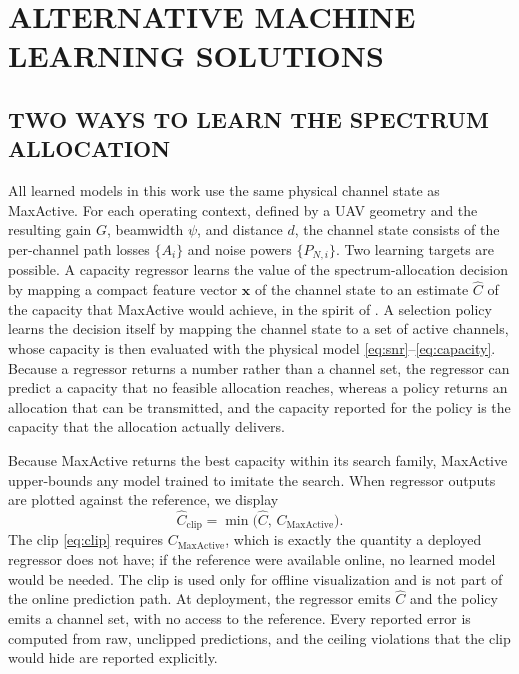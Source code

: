 \documentclass{ieee-ojvt}
\begin{document}
\section{ALTERNATIVE MACHINE LEARNING SOLUTIONS}
\label{sec:ml}
\subsection{TWO WAYS TO LEARN THE SPECTRUM ALLOCATION}
\label{sec:ml-overview}
All learned models in this work use the same physical channel state as MaxActive. For each
operating context, defined by a UAV geometry and the resulting gain $G$, beamwidth $\psi$,
and distance $d$, the channel state consists of the per-channel path losses $\{A_i\}$ and
noise powers $\{P_{N,i}\}$. Two learning targets are possible. A capacity regressor learns
the value of the spectrum-allocation decision by mapping a compact feature vector
$\mathbf{x}$ of the channel state to an estimate $\hat C$ of the capacity that MaxActive
would achieve, in the spirit of \cite{sun2018learning}. A selection policy learns the
decision itself by mapping the channel state to a set of active channels, whose capacity
is then evaluated with the physical model \eqref{eq:snr}--\eqref{eq:capacity}. Because a
regressor returns a number rather than a channel set, the regressor can predict a
capacity that no feasible allocation reaches, whereas a policy returns an allocation that
can be transmitted, and the capacity reported for the policy is the capacity that the
allocation actually delivers.

Because MaxActive returns the best capacity within its search family, MaxActive
upper-bounds any model trained to imitate the search. When regressor outputs are plotted
against the reference, we display
\begin{equation}
\hat{C}_{\text{clip}}=\min\!\big(\hat{C},\,C_{\text{MaxActive}}\big).
\label{eq:clip}
\end{equation}
The clip \eqref{eq:clip} requires $C_{\text{MaxActive}}$, which is exactly the quantity a
deployed regressor does not have; if the reference were available online, no learned
model would be needed. The clip is used only for offline visualization and is not part
of the online prediction path. At deployment, the regressor emits $\hat C$ and
the policy emits a channel set, with no access to the reference. Every reported error is
computed from raw, unclipped predictions, and the ceiling violations that the clip would
hide are reported explicitly.
\end{document}

